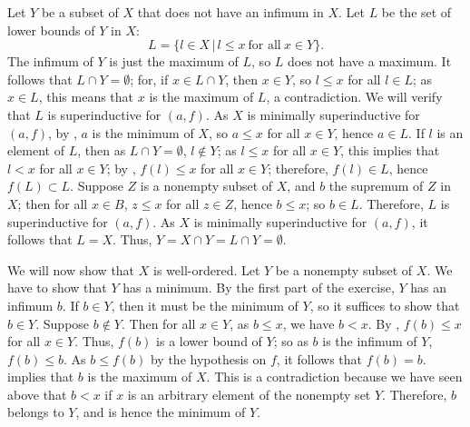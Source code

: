 \documentclass{article}
\begin{document}
\begin{solution}[\ref{exe:313bq61a}]
  \label{sol:eh1t1jcm}
  Let \(Y\) be a subset of \(X\) that does not have an infimum in
  \(X\).  Let \(L\) be the set of lower bounds of \(Y\) in \(X\):
  \begin{displaymath}
    L = \{ l \in X \,\vert\, l \leq x ~ \text{for all} ~ x \in Y \}.
  \end{displaymath}
  The infimum of \(Y\) is just the maximum of \(L\), so \(L\) does not
  have a maximum.  It follows that \(L \cap Y = \emptyset\); for, if
  \(x \in L \cap Y\), then \(x \in Y\), so \(l \leq x\) for all
  \(l \in L\); as \(x \in L\), this means that \(x\) is the maximum of
  \(L\), a contradiction.  We will verify that \(L\) is superinductive
  for \((a, f)\).  As \(X\) is minimally superinductive for
  \((a, f)\), by , \(a\) is the minimum of \(X\),
  so \(a \leq x\) for all \(x \in Y\), hence \(a \in L\).  If \(l\) is
  an element of \(L\), then as \(L \cap Y = \emptyset\),
  \(l \notin Y\); as \(l \leq x\) for all \(x \in Y\), this implies
  that \(l < x\) for all \(x \in Y\); by ,
  \(f(l) \leq x\) for all \(x \in Y\); therefore, \(f(l) \in L\),
  hence \(f(L) \subset L\).  Suppose \(Z\) is a nonempty subset of
  \(X\), and \(b\) the supremum of \(Z\) in \(X\); then for all
  \(x \in B\), \(z \leq x\) for all \(z \in Z\), hence \(b \leq x\);
  so \(b \in L\).  Therefore, \(L\) is superinductive for \((a, f)\).
  As \(X\) is minimally superinductive for \((a, f)\), it follows that
  \(L = X\).  Thus, \(Y = X \cap Y = L \cap Y = \emptyset\).

  We will now show that \(X\) is well-ordered.  Let \(Y\) be a
  nonempty subset of \(X\).  We have to show that \(Y\) has a minimum.
  By the first part of the exercise, \(Y\) has an infimum \(b\).  If
  \(b \in Y\), then it must be the minimum of \(Y\), so it suffices to
  show that \(b \in Y\).  Suppose \(b \notin Y\).  Then for all
  \(x \in Y\), as \(b \leq x\), we have \(b < x\).  By
  , \(f(b) \leq x\) for all \(x \in Y\).  Thus,
  \(f(b)\) is a lower bound of \(Y\); so as \(b\) is the infimum of
  \(Y\), \(f(b) \leq b\).  As \(b \leq f(b)\) by the hypothesis on
  \(f\), it follows that \(f(b) = b\).   implies
  that \(b\) is the maximum of \(X\).  This is a contradiction because
  we have seen above that \(b < x\) if \(x\) is an arbitrary element
  of the nonempty set \(Y\).  Therefore, \(b\) belongs to \(Y\), and
  is hence the minimum of \(Y\).
\end{solution}
\end{document}
